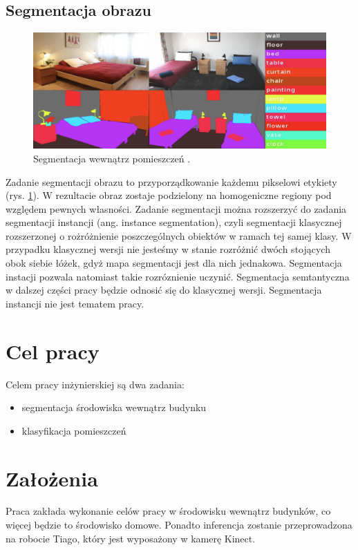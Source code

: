 \subsection{Segmentacja obrazu}
\begin{figure}
    \includegraphics[width=\textwidth]{images/segment.png}
    \caption{Segmentacja wewnątrz pomieszczeń \cite{zhang2018context}.}
    \label{fig:segment}
  \end{figure}
Zadanie segmentacji obrazu to przyporządkowanie każdemu pikselowi etykiety (rys. \ref{fig:segment}). W rezultacie obraz zostaje podzielony na homogeniczne regiony pod względem pewnych własności. Zadanie segmentacji można rozszerzyć do zadania segmentacji instancji (ang. instance segmentation), czyli segmentacji klasycznej rozszerzonej o rożróżnienie poszczególnych obiektów w ramach tej samej klasy. W przypadku klasycznej wersji nie jesteśmy w stanie rozróżnić dwóch stojących obok siebie łóżek, gdyż mapa segmentacji jest dla nich jednakowa. Segmentacja instacji pozwala natomiast takie rozróznienie uczynić. Segmentacja semtantyczna w dalszej części pracy będzie odnosić się do klasycznej wersji. Segmentacja instancji nie jest tematem pracy.
\section{Cel pracy}
Celem pracy inżynierskiej są dwa zadania:
\begin{itemize}
    \item segmentacja środowiska wewnątrz budynku
    \item klasyfikacja pomieszczeń
\end{itemize}
\section{Założenia}
Praca zakłada wykonanie celów pracy w środowisku wewnątrz budynków, co więcej będzie to środowisko domowe. Ponadto inferencja zostanie przeprowadzona na robocie Tiago, który jest wyposażony w kamerę Kinect.

